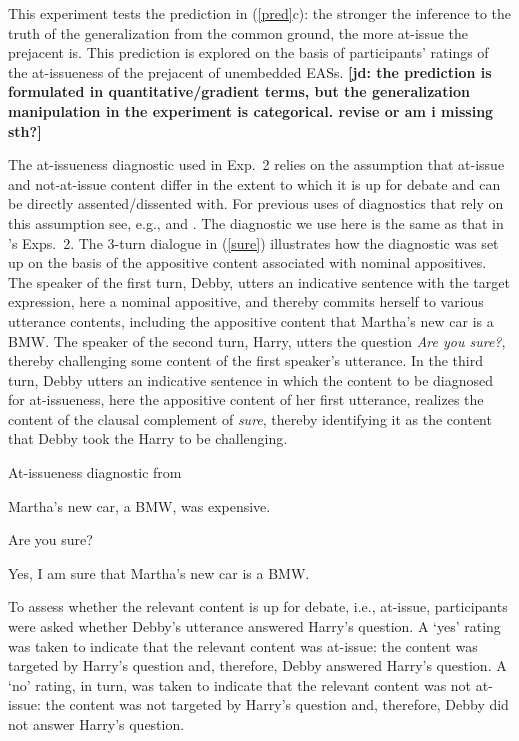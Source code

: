 \documentclass[11pt,fleqn]{article}
\newcommand{\6}{\mbox{$[\hspace*{-.6mm}[$}}
\newcommand{\9}{\mbox{$]\hspace*{-.6mm}]$}}
\newcommand{\citepos}[1]{\citeauthor{#1}'s \citeyear{#1}}
\newcommand{\jd}[1]{\textbf{\color{green}[jd: #1]}}
\begin{document}
This experiment tests the prediction in (\ref{pred}c): the stronger the inference to the truth of the generalization from the common ground, the more at-issue the prejacent is. This prediction is explored on the basis of participants' ratings of the at-issueness of the prejacent of unembedded EASs. \jd{the prediction is formulated in quantitative/gradient terms, but the generalization manipulation in the experiment is categorical. revise or am i missing sth?}

The at-issueness diagnostic used in Exp.~2 relies on the assumption that at-issue and not-at-issue content differ in the extent to which it is up for debate and can be directly assented/dissented with. For previous uses of diagnostics that rely on this assumption see, e.g., \citealt{amaral-etal07,xue-onea11,murray2014,anderbois-etal2015,destruel-etal2015,tonhauser-sula6} and \citealt{syrett-koev2015}. The diagnostic we use here is the same as that in \citepos{tbd-variability} Exps.~2. The 3-turn dialogue in (\ref{sure}) illustrates how the diagnostic was set up on the basis of the appositive content associated with nominal appositives. The speaker of the first turn, Debby, utters an indicative sentence with the target expression, here a nominal appositive, and thereby commits herself to various utterance contents, including the appositive content that Martha's new car is a BMW. The speaker of the second turn, Harry, utters the question {\em Are you sure?}, thereby challenging some content of the first speaker's utterance. In the third turn, Debby utters an indicative sentence in which the content to be diagnosed for at-issueness, here the appositive content of her first utterance, realizes the content of the clausal complement of {\em sure}, thereby identifying it as the content that Debby took the Harry to be challenging. 

\begin{exe}
\ex\label{sure} At-issueness diagnostic from \citealt{tbd-variability}
\begin{xlist}
 Martha's new car, a BMW, was expensive.

 Are you sure?

 Yes, I am sure that Martha's new car is a BMW. 
\end{xlist}
\end{exe}

To assess whether the relevant content is up for debate, i.e., at-issue, participants were asked whether Debby's utterance answered Harry's question. A `yes' rating was taken to indicate that the relevant content was at-issue: the content was targeted by Harry's question and, therefore, Debby answered Harry's question. A `no' rating, in turn, was taken to indicate that the relevant content was not at-issue: the content was not targeted by Harry's question and, therefore, Debby did not answer Harry's question.
\end{document}
